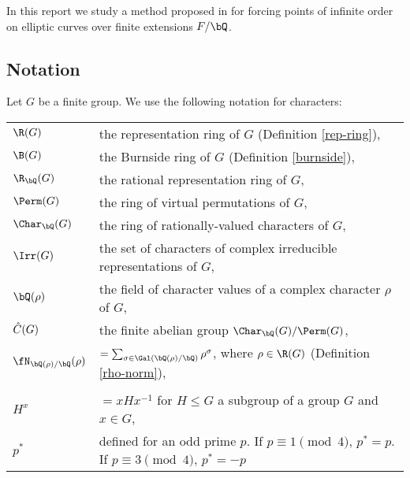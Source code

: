 In this report we study a method proposed in \cite{DEW1} for forcing points of infinite order on elliptic curves over finite extensions $F / \bQ$. 

\subsection*{Notation}
Let $G$ be a finite group. We use the following notation for characters:

\bigskip

\begin{tabular}{l | l}
     $\R(G)$ & the representation ring of $G$ (Definition \ref{rep-ring}), \\
     $\B(G)$ & the Burnside ring of $G$ (Definition \ref{burnside}), \\
    $\R_{\bQ}(G)$ & the rational representation ring of $G$, \\
    $\Perm(G)$ & the ring of virtual permutations of $G$, \\
    $\Char_{\bQ}(G)$ & the ring of rationally-valued characters of $G$,\\
    $\Irr(G)$ & the set of characters of complex irreducible representations of $G$, \\
    $\bQ(\rho)$ & the field of character values of a complex character $\rho$ of $G$, \\
    $\hat{C}(G)$ & the finite abelian group $\Char_{\bQ}(G) / \Perm(G)$, \\ 
    $\repnorm{\rho}$ &  $ = \sum_{\sigma \in \Gal(\bQ(\rho) / \bQ)} \rho^{\sigma}$, where $\rho \in \R(G)$ (Definition \ref{rho-norm}),\\
    \\
    $H^{x}$ & $= xHx^{-1}$  for $H \leq G$ a subgroup of a group $G$ and $x \in G$,\\
    $p^*$ & defined for an odd prime $p$. If $p \equiv 1 \pmod 4$, $p^* = p$. If $p \equiv 3 \pmod 4$, $p^* = -p$
\end{tabular}
\vspace{2em}


